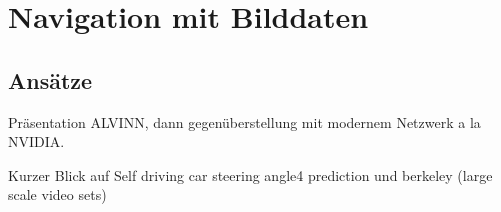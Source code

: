 %
\chapter{Navigation mit Bilddaten}

\section{Ansätze}

 Präsentation ALVINN, dann gegenüberstellung mit modernem Netzwerk a la NVIDIA.

Kurzer Blick auf  Self driving car steering angle4 prediction und berkeley (large scale video sets)




